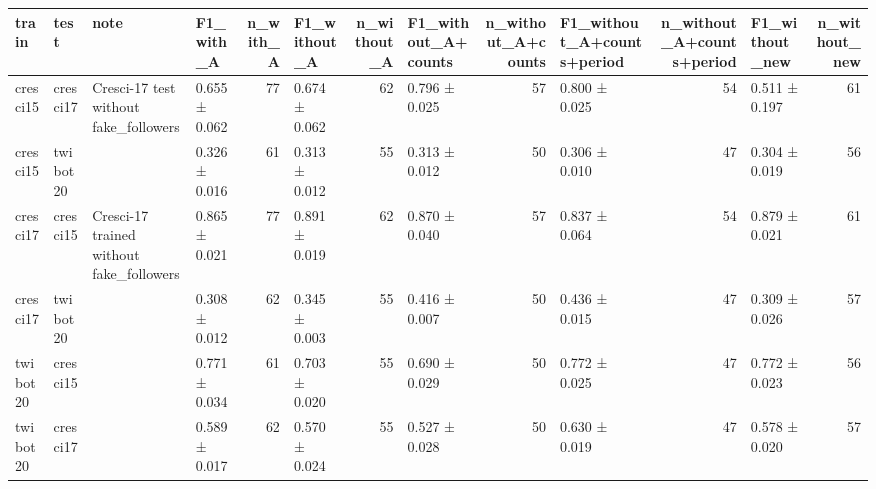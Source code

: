\begin{tabular}{llllrlrlrlrlr}
\toprule
train & test & note & F1_with_A & n_with_A & F1_without_A & n_without_A & F1_without_A+counts & n_without_A+counts & F1_without_A+counts+period & n_without_A+counts+period & F1_without_new & n_without_new \\
\midrule
cresci15 & cresci17 & Cresci-17 test without fake_followers & 0.655 ± 0.062 & 77 & 0.674 ± 0.062 & 62 & 0.796 ± 0.025 & 57 & 0.800 ± 0.025 & 54 & 0.511 ± 0.197 & 61 \\
cresci15 & twibot20 &  & 0.326 ± 0.016 & 61 & 0.313 ± 0.012 & 55 & 0.313 ± 0.012 & 50 & 0.306 ± 0.010 & 47 & 0.304 ± 0.019 & 56 \\
cresci17 & cresci15 & Cresci-17 trained without fake_followers & 0.865 ± 0.021 & 77 & 0.891 ± 0.019 & 62 & 0.870 ± 0.040 & 57 & 0.837 ± 0.064 & 54 & 0.879 ± 0.021 & 61 \\
cresci17 & twibot20 &  & 0.308 ± 0.012 & 62 & 0.345 ± 0.003 & 55 & 0.416 ± 0.007 & 50 & 0.436 ± 0.015 & 47 & 0.309 ± 0.026 & 57 \\
twibot20 & cresci15 &  & 0.771 ± 0.034 & 61 & 0.703 ± 0.020 & 55 & 0.690 ± 0.029 & 50 & 0.772 ± 0.025 & 47 & 0.772 ± 0.023 & 56 \\
twibot20 & cresci17 &  & 0.589 ± 0.017 & 62 & 0.570 ± 0.024 & 55 & 0.527 ± 0.028 & 50 & 0.630 ± 0.019 & 47 & 0.578 ± 0.020 & 57 \\
\bottomrule
\end{tabular}
